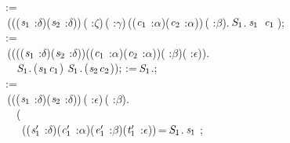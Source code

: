 \begin{holmath}
\,\,\,:=\\
\,\,\,\,(\HOLTokenLambda{}((\ensuremath{\HOLBoundVar{s}\sb{\mathrm{1}}} :\ensuremath{\delta})\HOLSymConst{,}(\ensuremath{\HOLBoundVar{s}\sb{\mathrm{2}}} :\ensuremath{\delta}))\,( :\ensuremath{\zeta})\,( :\ensuremath{\gamma})\,((\ensuremath{\HOLBoundVar{c}\sb{\mathrm{1}}} :\ensuremath{\alpha})\HOLSymConst{,}(\ensuremath{\HOLBoundVar{c}\sb{\mathrm{2}}} :\ensuremath{\alpha}))\,( :\ensuremath{\beta}).\,\ensuremath{\HOLFreeVar{S}\sb{\mathrm{1}}}.\,\ensuremath{\HOLBoundVar{s}\sb{\mathrm{1}}}\,\,\,\ensuremath{\HOLBoundVar{c}\sb{\mathrm{1}}}\,);\\
\,\,\,:=\\
\,\,\,\,(\HOLTokenLambda{}(((\ensuremath{\HOLBoundVar{s}\sb{\mathrm{1}}} :\ensuremath{\delta})\HOLSymConst{,}(\ensuremath{\HOLBoundVar{s}\sb{\mathrm{2}}} :\ensuremath{\delta}))\HOLSymConst{,}((\ensuremath{\HOLBoundVar{c}\sb{\mathrm{1}}} :\ensuremath{\alpha})\HOLSymConst{,}(\ensuremath{\HOLBoundVar{c}\sb{\mathrm{2}}} :\ensuremath{\alpha}))\HOLSymConst{,}( :\ensuremath{\beta})\HOLSymConst{,}( :\ensuremath{\epsilon})).\\
\,\,\,\,\,\,\,\,\,\ensuremath{\HOLFreeVar{S}\sb{\mathrm{1}}}.\,(\ensuremath{\HOLBoundVar{s}\sb{\mathrm{1}}}\HOLSymConst{,}\ensuremath{\HOLBoundVar{c}\sb{\mathrm{1}}}\HOLSymConst{,}\HOLSymConst{,})\,\HOLSymConst{\HOLTokenConj{}}\,\ensuremath{\HOLFreeVar{S}\sb{\mathrm{1}}}.\,(\ensuremath{\HOLBoundVar{s}\sb{\mathrm{2}}}\HOLSymConst{,}\ensuremath{\HOLBoundVar{c}\sb{\mathrm{2}}}\HOLSymConst{,}\HOLSymConst{,}));\,\,:=\,\ensuremath{\HOLFreeVar{S}\sb{\mathrm{1}}}.;\\
\,\,\,:=\\
\,\,\,\,(\HOLTokenLambda{}((\ensuremath{\HOLBoundVar{s}\sb{\mathrm{1}}} :\ensuremath{\delta})\HOLSymConst{,}(\ensuremath{\HOLBoundVar{s}\sb{\mathrm{2}}} :\ensuremath{\delta}))\,( :\ensuremath{\epsilon})\,( :\ensuremath{\beta}).\\
\,\,\,\,\,\,\,\,\,(\\
\,\,\,\,\,\,\,\,\,\,\,\,((\ensuremath{\HOLBoundVar{s}\sb{\mathrm{1}}\sp{\prime{}}} :\ensuremath{\delta})\HOLSymConst{,}(\ensuremath{\HOLBoundVar{c}\sb{\mathrm{1}}\sp{\prime{}}} :\ensuremath{\alpha})\HOLSymConst{,}(\ensuremath{\HOLBoundVar{e}\sb{\mathrm{1}}\sp{\prime{}}} :\ensuremath{\beta})\HOLSymConst{,}(\ensuremath{\HOLBoundVar{t}\sb{\mathrm{1}}\sp{\prime{}}} :\ensuremath{\epsilon}))\,=\,\ensuremath{\HOLFreeVar{S}\sb{\mathrm{1}}}.\,\ensuremath{\HOLBoundVar{s}\sb{\mathrm{1}}}\,\,;\\

\end{holmath}

